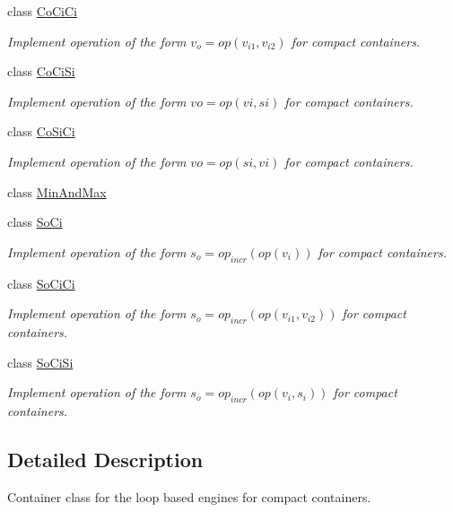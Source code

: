 \begin{DoxyCompactItemize}
class \hyperlink{classvct_dynamic_compact_loop_engines_1_1_co_ci_ci}{Co\-Ci\-Ci}
\begin{DoxyCompactList}\small\item\em Implement operation of the form $v_o = op(v_{i1}, v_{i2})$ for compact containers. \end{DoxyCompactList}\item 
class \hyperlink{classvct_dynamic_compact_loop_engines_1_1_co_ci_si}{Co\-Ci\-Si}
\begin{DoxyCompactList}\small\item\em Implement operation of the form $vo = op(vi, si)$ for compact containers. \end{DoxyCompactList}\item 
class \hyperlink{classvct_dynamic_compact_loop_engines_1_1_co_si_ci}{Co\-Si\-Ci}
\begin{DoxyCompactList}\small\item\em Implement operation of the form $vo = op(si, vi)$ for compact containers. \end{DoxyCompactList}\item 
class \hyperlink{classvct_dynamic_compact_loop_engines_1_1_min_and_max}{Min\-And\-Max}
\item 
class \hyperlink{classvct_dynamic_compact_loop_engines_1_1_so_ci}{So\-Ci}
\begin{DoxyCompactList}\small\item\em Implement operation of the form $s_o = op_{incr}(op(v_i))$ for compact containers. \end{DoxyCompactList}\item 
class \hyperlink{classvct_dynamic_compact_loop_engines_1_1_so_ci_ci}{So\-Ci\-Ci}
\begin{DoxyCompactList}\small\item\em Implement operation of the form $s_o = op_{incr}(op(v_{i1}, v_{i2}))$ for compact containers. \end{DoxyCompactList}\item 
class \hyperlink{classvct_dynamic_compact_loop_engines_1_1_so_ci_si}{So\-Ci\-Si}
\begin{DoxyCompactList}\small\item\em Implement operation of the form $s_o = op_{incr}(op(v_i, s_i))$ for compact containers. \end{DoxyCompactList}\end{DoxyCompactItemize}


\subsection{Detailed Description}
Container class for the loop based engines for compact containers. 

